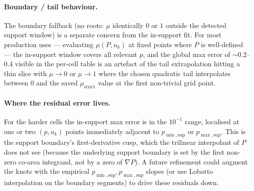 \documentclass[11pt]{article}
\begin{document}
\paragraph{Boundary / tail behaviour.}  The boundary fallback (no roots: $\mu$ identically $0$ or $1$ outside the detected support window) is a separate concern from the in-support fit.  For most production uses --- evaluating $\mu(P, u_k)$ at fixed points where $P$ is well-defined --- the in-support window covers all relevant $p$, and the global max error of $\sim 0.2$--$0.4$ visible in the per-cell table is an artefact of the tail extrapolation hitting a thin slice with $\mu \to 0$ or $\mu \to 1$ where the chosen quadratic tail interpolates between $0$ and the saved $\mu_{\mathrm{strict}}$ value at the first non-trivial grid point.

\paragraph{Where the residual error lives.}  For the harder cells the in-support max error is in the $10^{-1}$ range, localised at one or two $(p, u_k)$ points immediately adjacent to $p_{\min,\mathrm{sup}}$ or $p_{\max,\mathrm{sup}}$.  This is the support boundary's first-derivative cusp, which the trilinear interpolant of $P$ does not see (because the underlying support boundary is set by the first non-zero co-area integrand, not by a zero of $\nabla P$).  A future refinement could augment the knots with the empirical $p_{\min,\mathrm{sup}}, p_{\max,\mathrm{sup}}$ slopes (or use Lobatto interpolation on the boundary segments) to drive these residuals down.
\end{document}
